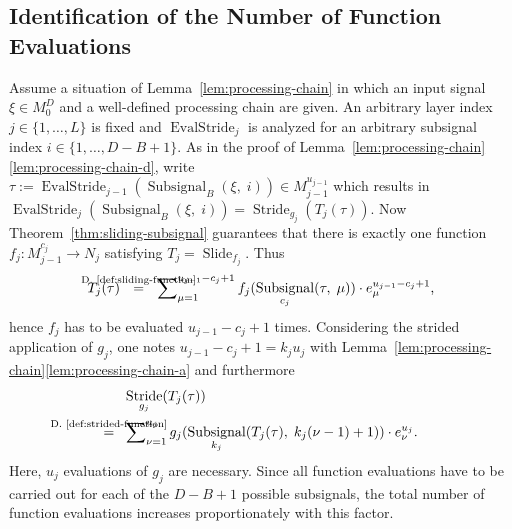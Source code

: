 \documentclass[journal]{IEEEtran}
\newcommand{\ROI}{B}
\newcommand{\discint}[2]{\{#1,\dotsc,#2\}}
\newcommand{\inint}[2]{\in\discint{#1}{#2}}
\DeclareMathOperator{\Subsignal}{Subsignal}
\DeclareMathOperator{\Slide}{Slide}
\DeclareMathOperator{\Stride}{Stride}
\DeclareMathOperator{\EvalStride}{EvalStride}
\newcommand{\equsing}[1]{\overset{\mathclap{\text{#1}}}{=}}
\begin{document}
\subsection{Identification of the Number of Function Evaluations}
Assume a situation of Lemma~\ref{lem:processing-chain} in which an input signal $\xi\in M_0^D$ and a well-defined processing chain are given.
An arbitrary layer index $j\inint{1}{L}$ is fixed and $\EvalStride_j$ is analyzed for an arbitrary subsignal index $i\inint{1}{D - B + 1}$.
As in the proof of Lemma~\ref{lem:processing-chain}\ref{lem:processing-chain-d}, write $\tau := \EvalStride_{j - 1}(\Subsignal_\ROI(\xi,\;i))\in M_{j - 1}^{u_{j - 1}}$ which results in $\EvalStride_j(\Subsignal_\ROI(\xi,\;i)) = \Stride_{g_j}(T_j(\tau))$.
Now Theorem~\ref{thm:sliding-subsignal} guarantees that there is exactly one function $f_j\colon M_{j - 1}^{c_j}\to N_j$ satisfying $T_j = \Slide_{f_j}$.
Thus
\begin{displaymath}
  T_j(\tau)\ \ \equsing{D.~\ref{def:sliding-function}}\ \ \sum\nolimits_{\mu = 1}^{u_{j - 1} - c_j + 1} f_j(\Subsignal_{c_j}(\tau,\;\mu))\cdot e_\mu^{u_{j - 1} - c_j + 1}\text{,}
\end{displaymath}
hence $f_j$ has to be evaluated $u_{j - 1} - c_j + 1$ times.
Considering the strided application of $g_j$, one notes $u_{j - 1} - c_j + 1 = k_j u_j$ with Lemma~\ref{lem:processing-chain}\ref{lem:processing-chain-a} and furthermore
\begin{align*}
     & \Stride_{g_j}(T_j(\tau))\\
  \equsing{D.~\ref{def:strided-function}}\ \ &\sum\nolimits_{\nu = 1}^{u_j} g_j(\Subsignal_{k_j}(T_j(\tau),\;k_j(\nu - 1) + 1))\cdot e_\nu^{u_j}\text{.}
\end{align*}
Here, $u_j$ evaluations of $g_j$ are necessary.
Since all function evaluations have to be carried out for each of the $D - B + 1$ possible subsignals, the total number of function evaluations increases proportionately with this factor.
\end{document}
